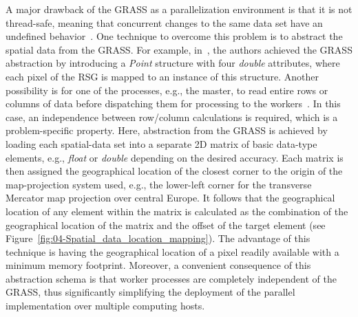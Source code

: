A major drawback of the GRASS as a parallelization environment is
that it is not thread-safe, meaning that concurrent changes to the
same data set have an undefined behavior~\cite{Blazek_GRASS_server:2004}.
One technique to overcome this problem is to abstract the spatial
data from the GRASS. For example, in~\cite{Huang-Explorations_of_the_implementation_of_a_parallel_IDW_algorithm_in_a_Linux_cluster:2011},
the authors achieved the GRASS abstraction by introducing a \emph{Point
}structure with four \emph{double} attributes, where each pixel of
the RSG is mapped to an instance of this structure. Another possibility
is for one of the processes, e.g., the master, to read entire rows
or columns of data before dispatching them for processing to the workers~\cite{Akhter-GRASS_GIS_on_high_performance_computing_with_MPI_OpenMP_and_Ninf-G:2010,Huang-Explorations_of_the_implementation_of_a_parallel_IDW_algorithm_in_a_Linux_cluster:2011}.
In this case, an independence between row/column calculations is required,
which is a problem-specific property. Here, abstraction from the GRASS
is achieved by loading each spatial-data set into a separate 2D matrix
of basic data-type elements, e.g., \emph{float} or \emph{double} depending
on the desired accuracy. Each matrix is then assigned the geographical
location of the closest corner to the origin of the map-projection
system used, e.g., the lower-left corner for the transverse Mercator
map projection over central Europe. It follows that the geographical
location of any element within the matrix is calculated as the combination
of the geographical location of the matrix and the offset of the target
element (see Figure~\ref{fig:04-Spatial_data_location_mapping}).
The advantage of this technique is having the geographical location
of a pixel readily available with a minimum memory footprint. Moreover,
a convenient consequence of this abstraction schema is that worker
processes are completely independent of the GRASS, thus significantly
simplifying the deployment of the parallel implementation over multiple
computing hosts.

